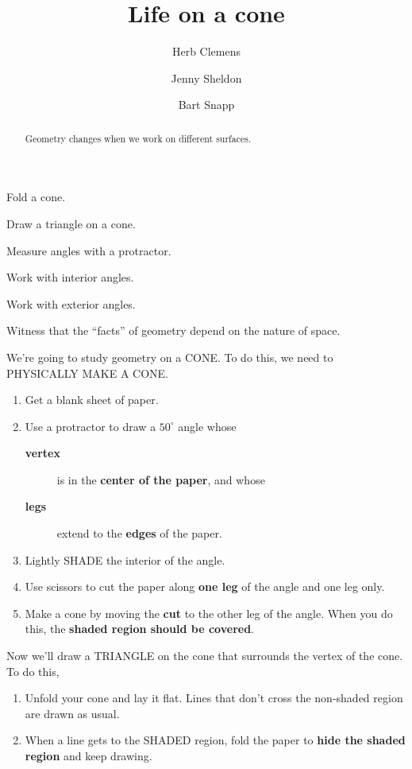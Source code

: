 \documentclass[nooutcomes,noauthor]{ximera}
\title{Life on a cone}
\author{Herb Clemens \and Jenny Sheldon \and Bart Snapp}
\begin{document}
\begin{abstract}
  Geometry changes when we work on different surfaces.
\end{abstract}
\maketitle


\begin{listOutcomes}
\item Fold a cone.
\item Draw a triangle on a cone.
\item Measure angles with a protractor.
\item Work with interior angles.
\item Work with exterior angles.
\item Witness that the ``facts'' of geometry depend on the nature of
  space.
\end{listOutcomes}

We're going to study geometry on a CONE. To do this, we need to
PHYSICALLY MAKE A CONE.

\begin{enumerate}
\item Get a blank sheet of paper.
\item Use a protractor to draw a $50^\circ$ angle whose
  \begin{description}
    \item[\textbf{vertex}] is in the \textbf{center of the paper}, and whose
    \item[\textbf{legs}] extend to the \textbf{edges} of the paper.
  \end{description}
  \item Lightly SHADE the interior of the angle.
  \item Use scissors to cut the paper along \textbf{one leg} of the
    angle and one leg only.
  \item Make a cone by moving the \textbf{cut} to the other leg of the
    angle. When you do this, the \textbf{shaded region should be covered}.
\end{enumerate}

Now we'll draw a TRIANGLE on the cone that surrounds the vertex of the
cone. To do this,
\begin{enumerate}
\item Unfold your cone and lay it flat. Lines that don't cross the
  non-shaded region are drawn as usual.
\item When a line gets to the SHADED region, fold the paper to \textbf{hide
  the shaded region} and keep drawing.
\end{enumerate}
\end{document}
